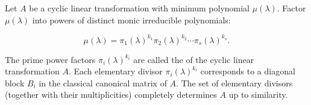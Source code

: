 Let $A$ be a cyclic linear transformation with minimum polynomial $\mu(\lambda)$. Factor $\mu(\lambda)$ into powers of distinct monic irreducible polynomials:

$$\mu(\lambda) = \pi_1(\lambda)^{k_1} \pi_2(\lambda)^{k_2} \cdots \pi_s(\lambda)^{k_s}.$$

The prime power factors $\pi_i(\lambda)^{k_i}$ are called the  of the cyclic linear transformation $A$. Each elementary divisor $\pi_i(\lambda)^{k_i}$ corresponds to a diagonal block $B_i$ in the classical canonical matrix of $A$. The set of elementary divisors (together with their multiplicities) completely determines $A$ up to similarity.
